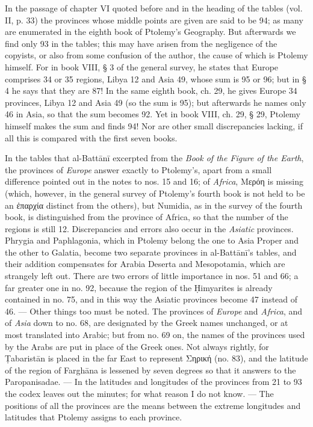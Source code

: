 \documentclass[11pt]{article}
\newcommand{\Pg}[1]{\marginpar{\footnotesize\color{gray}#1}}
\begin{document}
\par In the passage of chapter VI quoted before and in the heading of the tables (vol. II, p. 33) the provinces whose middle points are given are said to be 94; as many are enumerated in the eighth book of Ptolemy's Geography. But afterwards we find only 93 in the tables; this may have arisen from the negligence of the copyists, or also from some confusion of the author, the cause of which is Ptolemy himself. For in book VIII, § 3 of the general survey, he states that Europe comprises 34 or 35 regions, Libya 12 and Asia 49, whose sum is 95 or 96; but in § 4 he says that they are 87! In the same eighth book, ch. 29, he gives Europe 34 provinces, Libya 12 and Asia 49 (so the sum is 95); but afterwards he names only 46 in Asia, so that the sum becomes 92. Yet in book VIII, ch. 29, § 29, Ptolemy himself makes the sum and finds 94! Nor are other small discrepancies lacking, if all this is compared with the first seven books.\par
\par \Pg{II 212}In the tables that al-Battānī excerpted from the \emph{Book of the Figure of the Earth}, the provinces of \emph{Europe} answer exactly to Ptolemy's, apart from a small difference pointed out in the notes to nos. 15 and 16; of \emph{Africa}, {\greekfont Μερόη} is missing (which, however, in the general survey of Ptolemy's fourth book is not held to be an {\greekfont ἐπαρχία} distinct from the others), but Numidia, as in the survey of the fourth book, is distinguished from the province of Africa, so that the number of the regions is still 12. Discrepancies and errors also occur in the \emph{Asiatic} provinces. Phrygia and Paphlagonia, which in Ptolemy belong the one to Asia Proper and the other to Galatia, become two separate provinces in al-Battānī's tables, and their addition compensates for Arabia Deserta and Mesopotamia, which are strangely left out. There are two errors of little importance in nos. 51 and 66; a far greater one in no. 92, because the region of the Ḥimyarites is already contained in no. 75, and in this way the Asiatic provinces become 47 instead of 46. — Other things too must be noted. The provinces of \emph{Europe} and \emph{Africa}, and of \emph{Asia} down to no. 68, are designated by the Greek names unchanged, or at most translated into Arabic; but from no. 69 on, the names of the provinces used by the Arabs are put in place of the Greek ones. Not always rightly, for Ṭabaristān is placed in the far East to represent {\greekfont Σηρική} (no. 83), and the latitude of the region of Farghāna is lessened by seven degrees so that it answers to the Paropanisadae. — In the latitudes and longitudes of the provinces from 21 to 93 the codex leaves out the minutes; for what reason I do not know. — The positions of all the provinces are the means between the extreme longitudes and latitudes that Ptolemy assigns to each province.\par
\end{document}
